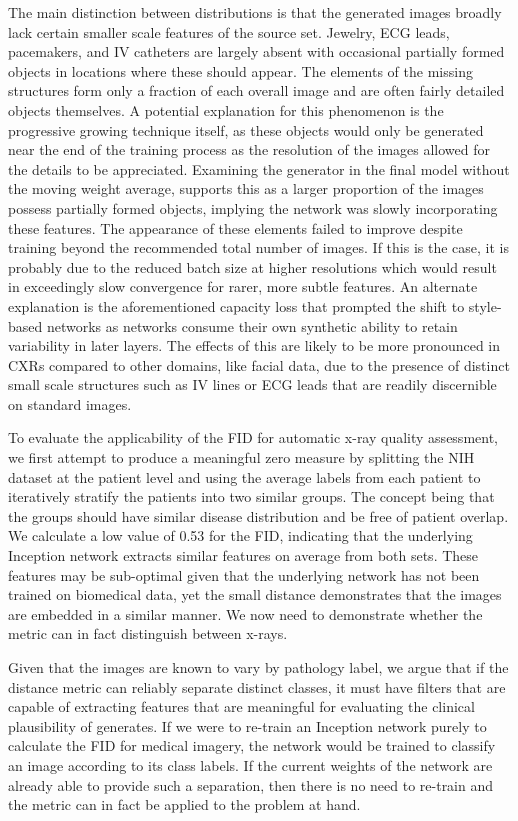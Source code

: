 \documentclass{article}
\begin{document}
The main distinction between distributions is that the generated images broadly lack certain smaller scale features of the source set. Jewelry, ECG leads, pacemakers, and IV catheters are largely absent with occasional partially formed objects in locations where these should appear. The elements of the missing structures form only a fraction of each overall image and are often fairly detailed objects themselves. A potential explanation for this phenomenon is the progressive growing technique itself, as these objects would only be generated near the end of the training process as the resolution of the images allowed for the details to be appreciated. Examining the generator in the final model without the moving weight average, supports this as a larger proportion of the images possess partially formed objects, implying the network was slowly incorporating these features. The appearance of these elements failed to improve despite training beyond the recommended total number of images. If this is the case, it is probably due to the reduced batch size at higher resolutions which would result in exceedingly slow convergence for rarer, more subtle features. An alternate explanation is the aforementioned capacity loss that prompted the shift to style-based networks as networks consume their own synthetic ability to retain variability in later layers. The effects of this are likely to be more pronounced in CXRs compared to other domains, like facial data, due to the presence of distinct small scale structures such as IV lines or ECG leads that are readily discernible on standard images. 

To evaluate the applicability of the FID for automatic x-ray quality assessment, we first attempt to produce a meaningful zero measure by splitting the NIH dataset at the patient level and using the average labels from each patient to iteratively stratify the patients into two similar groups. The concept being that the groups should have similar disease distribution and be free of patient overlap. We calculate a low value of \num{0.53} for the FID, indicating that the underlying Inception network extracts similar features on average from both sets. These features may be sub-optimal given that the underlying network has not been trained on biomedical data, yet the small distance demonstrates that the images are embedded in a similar manner. We now need to demonstrate whether the metric can in fact distinguish between x-rays.

Given that the images are known to vary by pathology label, we argue that if the distance metric can reliably separate distinct classes, it must have filters that are capable of extracting features that are meaningful for evaluating the clinical plausibility of generates. If we were to re-train an Inception network purely to calculate the FID for medical imagery, the network would be trained to classify an image according to its class labels. If the current weights of the network are already able to provide such a separation, then there is no need to re-train and the metric can in fact be applied to the problem at hand. 
\end{document}
